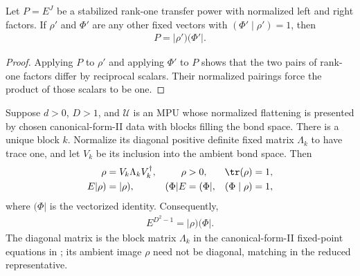 \begin{lemma}
    \label{thm:mpu_stabilized_fixed_pair_uniqueness}
    \leanok
    Let $P=E^J$ be a stabilized rank-one transfer power with normalized left
    and right factors. If $\rho'$ and $\Phi'$ are any other fixed vectors with
    $(\Phi'\mid\rho')=1$, then
    \begin{align}
        P=\lvert\rho')(\Phi'\rvert.
    \end{align}
\end{lemma}

\begin{proof}\leanok
    Applying $P$ to $\rho'$ and applying $\Phi'$ to $P$ shows that the two
    pairs of rank-one factors differ by reciprocal scalars. Their normalized
    pairings force the product of those scalars to be one.
\end{proof}

\begin{lemma}
    \label{thm:mpu_reduced_cfii_transfer_stabilization}
    \leanok
    Suppose $d>0$, $D>1$, and $\mathcal U$ is an MPU whose normalized
    flattening is presented by chosen canonical-form-II data with blocks
    filling the bond space. There is a
    unique block $k$. Normalize its diagonal positive definite fixed
    matrix $\Lambda_k$ to have trace one, and let $V_k$ be its inclusion into
    the ambient bond space. Then
    \begin{align}
        \rho         & =V_k\Lambda_kV_k^\dagger,
                     & \rho                      & >0,
                     & \tr(\rho)                 & =1,           \\
        E\lvert\rho) & =\lvert\rho),
                     & (\Phi\rvert E             & =(\Phi\rvert,
                     & (\Phi\mid\rho)            & =1,
    \end{align}
    where $(\Phi\rvert$ is the vectorized identity. Consequently,
    \begin{align}
        E^{D^2-1}=\lvert\rho)(\Phi\rvert.
    \end{align}
    The diagonal matrix is the block matrix $\Lambda_k$ in the canonical-form-II
    fixed-point equations in
    \cite[equations~(6a)--(6b)]{Cirac2017MPU}; its ambient image
    $\rho$ need not be diagonal, matching in \cite[proof of Proposition~III.2(ii)]{Cirac2017MPU} the reduced
    representative.
\end{lemma}

